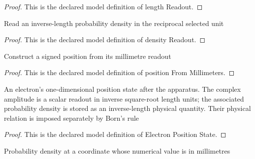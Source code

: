 \begin{proof}
  This is the declared model definition of length Readout.
\end{proof}
\begin{definition}
  \label{def:physics:phyx-mini-0501:phyxminiproblems-problemphyxmini0501-densityreadout}
  Read an inverse-length probability density in the reciprocal selected unit
\end{definition}
\begin{proof}
  This is the declared model definition of density Readout.
\end{proof}
\begin{definition}
  \label{def:physics:phyx-mini-0501:phyxminiproblems-problemphyxmini0501-positionfrommillimeters}
  Construct a signed position from its millimetre readout
\end{definition}
\begin{proof}
  This is the declared model definition of position From Millimeters.
\end{proof}
\begin{definition}
  \label{def:physics:phyx-mini-0501:phyxminiproblems-problemphyxmini0501-electronpositionstate}
  An electron's one-dimensional position state after the apparatus. The complex amplitude is a scalar readout in inverse square-root length units; the associated probability density is stored as an inverse-length physical quantity. Their physical relation is imposed separately by Born's rule
\end{definition}
\begin{proof}
  This is the declared model definition of Electron Position State.
\end{proof}
\begin{definition}
  \label{def:physics:phyx-mini-0501:phyxminiproblems-problemphyxmini0501-densityatmillimetercoordinate}
  Probability density at a coordinate whose numerical value is in millimetres
\end{definition}
